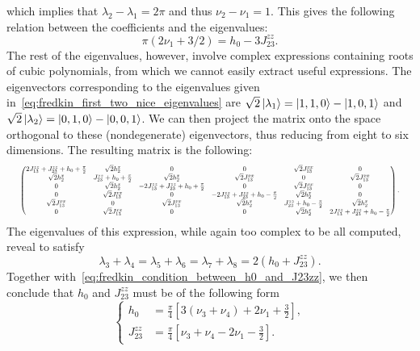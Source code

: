 which implies that $\lambda_2-\lambda_1= 2\pi$ and thus $\nu_2-\nu_1=1$.
This gives the following relation between the coefficients and the eigenvalues:
\begin{equation}
    \pi(2\nu_1 + 3/2) = h_0 - 3 J_{23}^{zz}.
    \label{eq:fredkin_condition_between_h0_and_J23zz}
\end{equation}
The rest of the eigenvalues, however, involve complex expressions containing roots of cubic polynomials, from which we cannot easily extract useful expressions.
The eigenvectors corresponding to the eigenvalues given in~\cref{eq:fredkin_first_two_nice_eigenvalues} are
$\sqrt2\ket{\lambda_1} = \ket{1,1,0} - \ket{1,0,1}$
and
$\sqrt2\ket{\lambda_2} = \ket{0,1,0} - \ket{0,0,1}$.
We can then project the matrix onto the space orthogonal to these (nondegenerate) eigenvectors, thus reducing from eight to six dimensions. The resulting matrix is the following:
\begin{equation}\scalebox{0.6}{$%
\begin{pmatrix}
	2 J_{13}^{zz} + J_{23}^{zz} + h_{0} + \frac{\pi }{2} & \sqrt{2} h_{2}^{x} & 0 & 0 & \sqrt{2} J_{13}^{xx} & 0 \\
	\sqrt{2} h_{2}^{x} & J_{23}^{zz} + h_{0} + \frac{\pi }{2} & \sqrt{2} h_{2}^{x} & \sqrt{2} J_{13}^{xx} & 0 & \sqrt{2} J_{13}^{xx} \\
	0 & \sqrt{2} h_{2}^{x} & -2 J_{13}^{zz} + J_{23}^{zz} + h_{0} + \frac{\pi }{2} & 0 & \sqrt{2} J_{13}^{xx} & 0 \\
	0 & \sqrt{2} J_{13}^{xx} & 0 & -2 J_{13}^{zz} + J_{23}^{zz} + h_{0}-\frac{\pi }{2} & \sqrt{2} h_{2}^{x} & 0 \\
	\sqrt{2} J_{13}^{xx} & 0 & \sqrt{2} J_{13}^{xx} & \sqrt{2} h_{2}^{x} & J_{23}^{zz} + h_{0}-\frac{\pi }{2} & \sqrt{2} h_{2}^{x} \\
	0 & \sqrt{2} J_{13}^{xx} & 0 & 0 & \sqrt{2} h_{2}^{x} & 2 J_{13}^{zz} + J_{23}^{zz} + h_{0}-\frac{\pi }{2} \\
\end{pmatrix}.$}
\end{equation}
The eigenvalues of this expression, while again too complex to be all computed, reveal to satisfy
\begin{equation}
    \lambda_3 + \lambda_4
    = \lambda_5 + \lambda_6
    = \lambda_7 + \lambda_8 = 2(h_0 + J_{23}^{zz}).
\end{equation}
Together with~\cref{eq:fredkin_condition_between_h0_and_J23zz}, we then conclude that $h_0$ and $J_{23}^{zz}$ must be of the following form
\begin{equation}
\begin{cases}
    h_0 &= \frac{\pi}{4}\left[3(\nu_3+\nu_4) + 2\nu_1+\frac{3}{2}\right], \\
    J_{23}^{zz} &= \frac{\pi}{4}\left[\nu_3+\nu_4 - 2\nu_1-\frac{3}{2}\right].
\end{cases}
\label{eq:fredkin_sols_h0_and_J23zz_vs_nus}
\end{equation}
